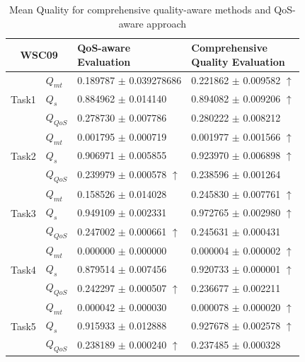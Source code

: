 \documentclass{IEEEtran}
\begin{document}
\begin{table}[]
\footnotesize
\centering
\caption{Mean Quality for comprehensive quality-aware methods and QoS-aware approach}
\label{decisionTable}
\begin{tabular}{l|l|l|l}
\hline
\multicolumn{2}{c|}{WSC09}              & \shortstack{QoS-aware \\ Evaluation} & \shortstack{Comprehensive \\ Quality Evaluation} \\ \hline
\multirow{3}{*}{Task1}  &$Q_{mt}$   &0.189787 $\pm$ 0.039278686            &0.221862 $\pm$ 0.009582 $\uparrow$ \\ \cline{2-4} 
                        &$Q_{s}$    &0.884962 $\pm$ 0.014140               &0.894082 $\pm$ 0.009206 $\uparrow$ \\ \cline{2-4}
                        &$Q_{QoS}$  &0.278730 $\pm$ 0.007786               &0.280222 $\pm$ 0.008212                          \\ \hline
\multirow{3}{*}{Task2}  &$Q_{mt}$   &0.001795 $\pm$ 0.000719               &0.001977 $\pm$ 0.001566 $\uparrow$ \\ \cline{2-4} 
                        &$Q_{s}$    &0.906971 $\pm$ 0.005855               &0.923970 $\pm$ 0.006898 $\uparrow$   \\ \cline{2-4}
                        &$Q_{QoS}$  &0.239979 $\pm$ 0.000578 $\uparrow$    &0.238596 $\pm$ 0.001264 \\ \hline
\multirow{3}{*}{Task3}  &$Q_{mt}$   &0.158526 $\pm$ 0.014028               &0.245830 $\pm$ 0.007761 $\uparrow$   \\ \cline{2-4} 
                        &$Q_{s}$    &0.949109 $\pm$ 0.002331               &0.972765 $\pm$ 0.002980 $\uparrow$           \\ \cline{2-4}
                        &$Q_{QoS}$  &0.247002 $\pm$ 0.000661 $\uparrow$    &0.245631 $\pm$ 0.000431            \\ \hline
\multirow{3}{*}{Task4}  &$Q_{mt}$   &0.000000 $\pm$ 0.000000               &0.000004 $\pm$ 0.000002 $\uparrow$ \\ \cline{2-4} 
                        &$Q_{s}$    &0.879514 $\pm$ 0.007456               &0.920733 $\pm$ 0.000001 $\uparrow$ \\ \cline{2-4}
                        &$Q_{QoS}$  &0.242297 $\pm$ 0.000507 $\uparrow$    &0.236677 $\pm$ 0.002211  \\ \hline
\multirow{3}{*}{Task5}  &$Q_{mt}$   &  0.000042 $\pm$ 0.000030             &0.000078 $\pm$ 0.000020 $\uparrow$           \\ \cline{2-4} 
                        &$Q_{s}$    &  0.915933 $\pm$ 0.012888             &0.927678 $\pm$ 0.002578 $\uparrow$                 \\ \cline{2-4}
                        &$Q_{QoS}$  & 0.238189 $\pm$ 0.000240 $\uparrow$      &  0.237485 $\pm$  0.000328  \\ \hline                                                   
\end{tabular}
\end{table}
\end{document}
